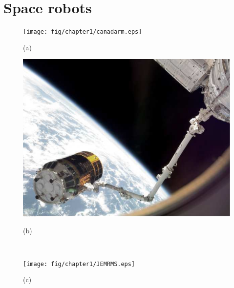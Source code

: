%



\section{Space robots}
%
\begin{figure}[t]
  \centering
  \begin{minipage}{0.45\linewidth}
    \centering
    \texttt{[image: fig/chapter1/canadarm.eps]}
    \footnotesize\par{(a)}
  \end{minipage}
  \hspace{2mm}
  \begin{minipage}{0.45\linewidth}
    \centering
    \includegraphics[width=1.0\linewidth]{fig/chapter1/canadarm2.eps}
    \footnotesize\par{(b)}
  \end{minipage}\\
  \vspace{1em}
  \begin{minipage}{0.45\linewidth}
    \centering
    \texttt{[image: fig/chapter1/JEMRMS.eps]}
    \footnotesize\par{(c)}

\end{minipage}
\end{figure}
